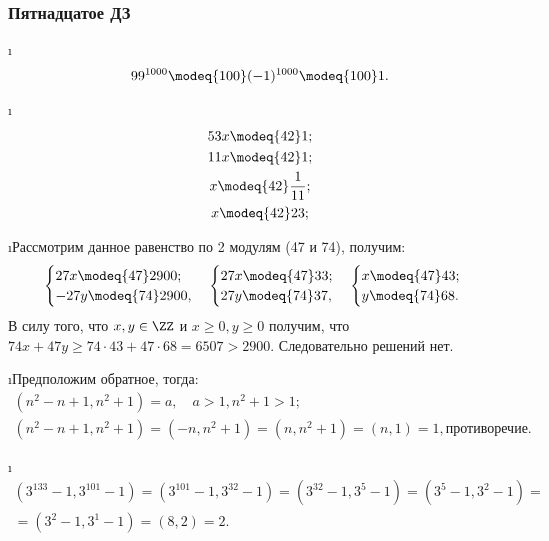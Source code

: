 \subsubsection{Пятнадцатое ДЗ}

\i
\begin{gather*}
    99^{1000} \modeq{100} (-1)^{1000} \modeq{100} 1.
\end{gather*}

\i
\begin{gather*}
    53x \modeq{42} 1;\\
    11x \modeq{42} 1;\\
    x \modeq{42} \frac{1}{11};\\
    x \modeq{42} 23;
\end{gather*}

\i Рассмотрим данное равенство по 2 модулям (47 и 74), получим:
\begin{gather*}
    \begin{cases}
        27x \modeq{47} 2900;\\
        -27y \modeq{74} 2900,
    \end{cases}
    \begin{cases}
        27x \modeq{47} 33;\\
        27y \modeq{74} 37,
    \end{cases}
    \begin{cases}
        x \modeq{47} 43;\\
        y \modeq{74} 68.
    \end{cases}
\end{gather*}
В силу того, что $x, y \in \ZZ$ и $x \geq 0, y \geq 0$ получим, что $74x + 47y \geq 74\cdot43 + 47\cdot68 = 6507 > 2900$. Следовательно решений нет.

\i Предположим обратное, тогда:
\begin{gather*}
    (n^2-n+1, n^2+1) = a, \quad a > 1, n^2+1 > 1;\\
    (n^2-n+1, n^2+1) = (-n, n^2+1) = (n, n^2+1) = (n, 1) = 1, \text{противоречие.}
\end{gather*}

\i
\begin{gather*}
    (3^{133}-1, 3^{101}-1) = (3^{101}-1, 3^{32}-1) = (3^{32}-1, 3^{5}-1) = (3^{5}-1, 3^{2}-1) = \\ = (3^{2}-1, 3^1-1) = (8, 2) = 2. 
\end{gather*}

